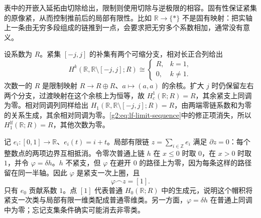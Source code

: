 表中的开嵌入延拓由切除给出，限制则使用切除与逆极限的相容。固有性保证紧集的原像紧，从而控制推前后的局部有限性。比如 \(\mathbb R\to\{*\}\) 不是固有映射：把实轴上一条由无穷多段组成的链推到一点，会要求把无穷多个系数相加，通常没有意义。

\begin{example}\label{g2:exm:line-supports}
	设系数为 \(R\)。紧集 \([-j,j]\) 的补集有两个可缩分支，相对长正合列给出
	\[
		H^k(\mathbb R,\mathbb R\setminus[-j,j];R)
		\cong
		\begin{cases}R,&k=1,\\0,&k\ne1.\end{cases}
	\]
	次数一的 \(R\) 是限制映射 \(R\to R\oplus R\)、\(a\mapsto(a,a)\) 的余核。扩大 \(j\) 时仍保留左右两个分支，过渡映射在这个余核上为恒等，故 \(H_c^1(\mathbb R;R)=R\)，其余紧支上同调为零。相对同调列同样给出 \(H_1(\mathbb R,\mathbb R\setminus[-j,j];R)=R\)，由两端零链系数和为零的关系生成，其余相对同调为零。\eqref{g2:eq:lf-limit-sequence}中的修正项消失，所以 \(H_1^{\mathrm{lf}}(\mathbb R;R)=R\)，其他次数为零。

	记 \(e_i:[0,1]\to\mathbb R\)、\(e_i(t)=i+t\)。局部有限链 \(z=\sum_{i\in\mathbb Z}e_i\) 满足 \(\partial z=0\)：每个整数点的两项边界互相抵消。令零次普通上链 \(h\) 在 \(x\le0\) 时取 \(0\)，在 \(x>0\) 时取 \(1\)，并令 \(\varphi=\delta h\)。\(h\) 不紧支，但 \(\varphi\) 在避开 \(0\) 的路径上为零，因为每条这样的路径留在同一半轴。因此 \(\varphi\) 是紧支一次上圈，且
	\[
		\varphi\frown z=[1].
	\]
	只有 \(e_0\) 贡献系数 \(1\)。点 \([1]\) 代表普通 \(H_0(\mathbb R;R)\) 中的生成元，说明这个帽积将紧支一次类与局部有限一维类配成普通零维类。另一方面，\(\varphi=\delta h\) 在普通上同调中为零；忘记支集条件确实可能消去非零类。
\end{example}
